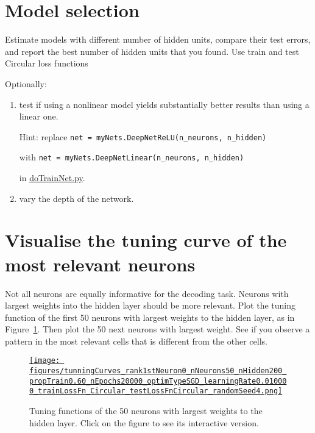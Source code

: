 \documentclass[12pt]{article}
\begin{document}
\section{Model selection}

Estimate models with different number of hidden units, compare their test
errors, and report the best number of hidden units that you found. Use train and
test Circular loss functions

Optionally:

\begin{enumerate}

    \item test if using a nonlinear model yields substantially better results
        than using a linear one.

        Hint: replace \texttt{net =
        myNets.DeepNetReLU(n\_neurons, n\_hidden)}

        with \texttt{net = myNets.DeepNetLinear(n\_neurons, n\_hidden)}

        in
        \href{https://github.com/joacorapela/statNeuro2025/blob/master/worksheets/08_artificialNeuralNetworks/code/scripts/doTrainNet.py}{doTrainNet.py}.

    \item vary the depth of the network.

\end{enumerate}

\section{Visualise the tuning curve of the most relevant neurons}

Not all neurons are equally informative for the decoding task. Neurons with
largest weights into the hidden layer should be more relevant. Plot the tuning
function of the first 50 neurons with largest weights to the hidden layer, as
in Figure~\ref{fig:tunningFunctionsFirst50}. Then plot the 50 next neurons with largest weight. See if
you observe a pattern in the most relevant cells that is different from the
other cells.

\begin{figure}[H]
    \begin{center}
        \href{https://www.gatsby.ucl.ac.uk/~rapela/statNeuro/2025/worksheets/08_artificialNeuralNetworks/figures/tunningCurves_rank1stNeuron0_nNeurons50_nHidden200_propTrain0.60_nEpochs20000_optimTypeSGD_learningRate0.010000_trainLossFn_Circular_testLossFnCircular_randomSeed4.html}{\texttt{[image: figures/tunningCurves\_rank1stNeuron0\_nNeurons50\_nHidden200\_propTrain0.60\_nEpochs20000\_optimTypeSGD\_learningRate0.010000\_trainLossFn\_Circular\_testLossFnCircular\_randomSeed4.png]}}

        \caption{Tuning functions of the 50 neurons with largest weights to the
        hidden layer. Click on the figure to see its interactive version.}

        \label{fig:tunningFunctionsFirst50}
    \end{center}
\end{figure}
\end{document}
